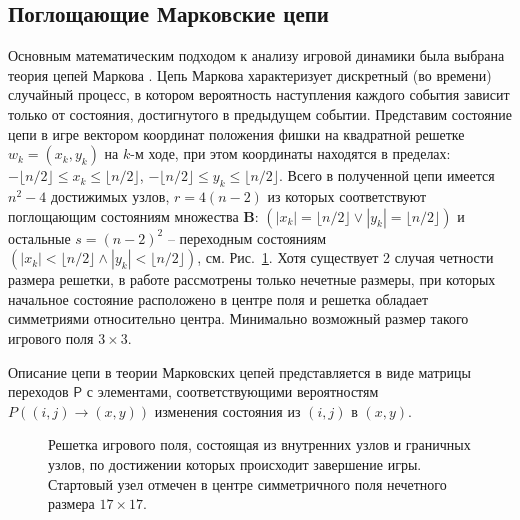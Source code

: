 
\subsection{Поглощающие Марковские цепи}\label{subsec:ch3/sec2/sub1}

Основным математическим подходом к анализу игровой динамики была выбрана теория цепей Маркова \cite{gagniuc_markov_2017}.
Цепь Маркова характеризует дискретный (во времени) случайный процесс, в котором вероятность наступления каждого события 
зависит только от состояния, достигнутого в предыдущем событии. Представим состояние цепи в игре вектором координат 
положения фишки на квадратной решетке $w_k = (x_k, y_k)$ на $k$-м ходе, при этом координаты находятся в пределах: 
$-\lfloor n/2 \rfloor \leq x_k \leq \lfloor n/2 \rfloor$, $-\lfloor n/2 \rfloor \leq y_k \leq \lfloor n/2 \rfloor$. 
Всего в полученной цепи имеется $n^2-4$ достижимых узлов, $r=4(n-2)$ из которых соответствуют поглощающим состояниям множества $\textbf{B}$: 
$(|x_k|=\lfloor n/2 \rfloor \lor |y_k|=\lfloor n/2 \rfloor)$ и остальные $s=(n-2)^2$ -- переходным состояниям
$(|x_k|<\lfloor n/2 \rfloor \land |y_k|<\lfloor n/2 \rfloor)$, см. Рис.~\cref{fig:game_field}. 
Хотя существует 2 случая четности размера решетки, в работе рассмотрены только нечетные размеры, при которых 
начальное состояние расположено в центре поля и решетка обладает симметриями относительно центра. 
Минимально возможный размер такого игрового поля $3 \times 3$. 

Описание цепи в теории Марковских цепей представляется в виде матрицы переходов \cite{kemeny_finite_1976} $\mathsf{P}$ с элементами,
соответствующими вероятностям $P((i, j) \rightarrow (x, y))$ изменения состояния из $(i, j)$ в $(x, y)$.

\begin{figure}[ht]
    \caption{
        Решетка игрового поля, состоящая из внутренних узлов и граничных узлов, по достижении которых происходит завершение игры.
        Стартовый узел отмечен в центре симметричного поля нечетного размера $17 \times 17$.
    }\label{fig:game_field}
\end{figure}

